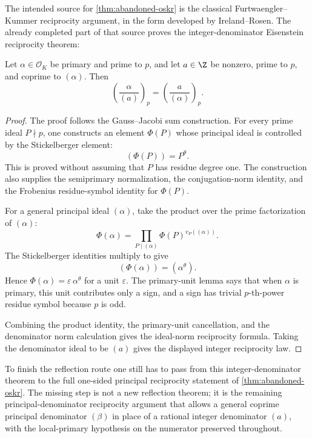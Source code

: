 The intended source for \cref{thm:abandoned-oskr} is the classical
Furtwaengler--Kummer reciprocity argument, in the form developed by
Ireland--Rosen.  The already completed part of that source proves the
integer-denominator Eisenstein reciprocity theorem:

\begin{theorem}
  \label{thm:ireland-rosen-integer-reciprocity}
  \leanok
Let \(\alpha\in\mathcal O_K\) be primary and prime to \(p\), and let
\(a\in\Z\) be nonzero, prime to \(p\), and coprime to \((\alpha)\).  Then
\[
  \left(\frac{\alpha}{(a)}\right)_p
  =
  \left(\frac{a}{(\alpha)}\right)_p .
\]
\end{theorem}

\begin{proof}\leanok
The proof follows the Gauss--Jacobi sum construction.  For every prime ideal
\(P\nmid p\), one constructs an element \(\Phi(P)\) whose principal ideal is
controlled by the Stickelberger element:
\[
  (\Phi(P))=P^\theta .
\]
This is proved without assuming that \(P\) has residue degree one.  The
construction also supplies the semiprimary normalization, the conjugation-norm
identity, and the Frobenius residue-symbol identity for \(\Phi(P)\).

For a general principal ideal \((\alpha)\), take the product over the prime
factorization of \((\alpha)\):
\[
  \Phi(\alpha)=
  \prod_{P\mid(\alpha)}\Phi(P)^{v_P((\alpha))}.
\]
The Stickelberger identities multiply to give
\[
  (\Phi(\alpha))=(\alpha^\theta).
\]
Hence \(\Phi(\alpha)=\varepsilon\,\alpha^\theta\) for a unit
\(\varepsilon\).  The primary-unit lemma says that when \(\alpha\) is
primary, this unit contributes only a sign, and a sign has trivial
\(p\)-th-power residue symbol because \(p\) is odd.

Combining the product identity, the primary-unit cancellation, and the
denominator norm calculation gives the ideal-norm reciprocity formula.  Taking
the denominator ideal to be \((a)\) gives the displayed integer reciprocity
law.
\end{proof}

To finish the reflection route one still has to pass from this
integer-denominator theorem to the full one-sided principal reciprocity
statement of \cref{thm:abandoned-oskr}.  The missing step is not a new
reflection theorem; it is the remaining principal-denominator reciprocity
argument that allows a general coprime principal denominator \((\beta)\) in
place of a rational integer denominator \((a)\), with the local-primary
hypothesis on the numerator preserved throughout.
